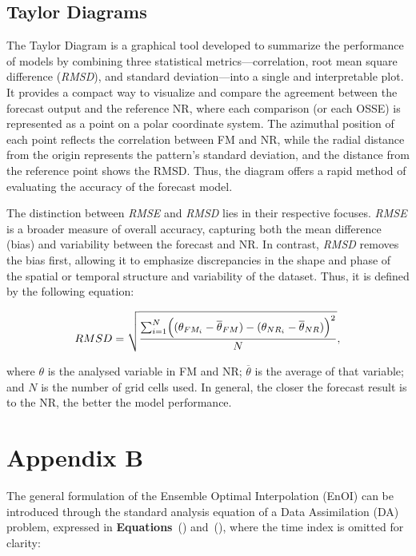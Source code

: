 \subsection{Taylor Diagrams} \label{subsec:cp2_taylor}
The Taylor Diagram \parencite{taylor2001summarizing} is a graphical tool developed to summarize the performance of models by combining three statistical metrics---correlation, root mean square difference (\textit{RMSD}), and standard deviation---into a single and interpretable plot. It provides a compact way to visualize and compare the agreement between the forecast output and the reference NR, where each comparison (or each OSSE) is represented as a point on a polar coordinate system. The azimuthal position of each point reflects the correlation between FM and NR, while the radial distance from the origin represents the pattern's standard deviation, and the distance from the reference point shows the RMSD. Thus, the diagram offers a rapid method of evaluating the accuracy of the forecast model.

The distinction between \textit{RMSE} and \textit{RMSD} lies in their respective focuses. \textit{RMSE} is a broader measure of overall accuracy, capturing both the mean difference (bias) and variability between the forecast and NR. In contrast, \textit{RMSD} removes the bias first, allowing it to emphasize discrepancies in the shape and phase of the spatial or temporal structure and variability of the dataset. Thus, it is defined by the following equation:

\begin{equation}\label{eq:cp2_rmsd}
    RMSD = \sqrt{\frac{\sum_{i=1}^N \Bigl( (\theta_{FM_i} - \overline\theta_{FM}) - (\theta_{NR_i} - \overline\theta_{NR}) \Bigr)^2}{N}},
\end{equation}

\noindent where $\theta$ is the analysed variable in FM and NR; $\overline\theta$ is the average of that variable; and $N$ is the number of grid cells used. In general, the closer the forecast result is to the NR, the better the model performance.
 
\section{Appendix B} \label{sec:ossedesign_appxB}
The general formulation of the Ensemble Optimal Interpolation (EnOI) can be introduced through the standard analysis equation of a Data Assimilation (DA) problem, expressed in \textbf{Equations}~() and~(), where the time index is omitted for clarity:

